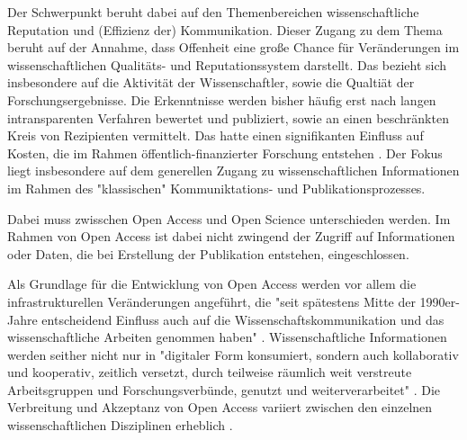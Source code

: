 Der Schwerpunkt beruht dabei auf den Themenbereichen wissenschaftliche Reputation und (Effizienz der) Kommunikation. Dieser Zugang zu dem Thema beruht auf der Annahme, dass Offenheit eine große Chance für Veränderungen im wissenschaftlichen Qualitäts- und Reputationssystem darstellt. Das bezieht sich insbesondere auf die Aktivität der Wissenschaftler, sowie die Qualtiät der Forschungsergebnisse. Die Erkenntnisse werden bisher häufig erst nach langen intransparenten Verfahren bewertet und publiziert, sowie an einen beschränkten Kreis von Rezipienten vermittelt. Das hatte einen signifikanten Einfluss auf Kosten, die im Rahmen öffentlich-finanzierter Forschung entstehen \cite{suchen}. Der Fokus liegt insbesondere auf dem generellen Zugang zu wissenschaftlichen Informationen im Rahmen des "klassischen" Kommuniktations- und Publikationsprozesses. 

Dabei muss zwisschen Open Access und Open Science unterschieden werden. Im Rahmen von Open Access ist dabei nicht zwingend der Zugriff auf Informationen oder Daten, die bei Erstellung der Publikation entstehen, eingeschlossen. 

Als Grundlage für die Entwicklung von Open Access werden vor allem die infrastrukturellen Veränderungen angeführt, die "seit spätestens Mitte der 1990er-Jahre entscheidend Einfluss auch auf die Wissenschaftskommunikation und das wissenschaftliche Arbeiten genommen haben" \cite{schulze_2013_open}. Wissenschaftliche Informationen werden seither nicht nur in "digitaler Form konsumiert, sondern auch kollaborativ und kooperativ, zeitlich versetzt, durch teilweise räumlich weit verstreute Arbeitsgruppen und Forschungsverbünde, genutzt und weiterverarbeitet" \cite{schulze_2013_open}. Die Verbreitung und Akzeptanz von Open Access variiert zwischen den einzelnen wissenschaftlichen Disziplinen erheblich \cite{cite:21a}.


